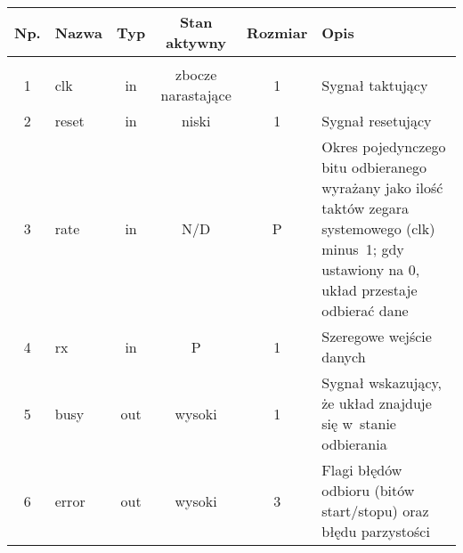 

\begin{table}[h]
\small
\centering
\begin{tabular}{|c|l|c|c|c|m{4.5cm}|}
\hline
\rowcolor[HTML]{C0C0C0}
\textbf{Np.} & \textbf{Nazwa} & \textbf{Typ} & \textbf{Stan aktywny} & \textbf{Rozmiar} & \textbf{Opis}                                                                                                                                      \\ \hline
\rowcolor[HTML]{F8A102}\multicolumn{6}{|l|}{Układ odbierający UART} \\ \hline
1            & clk            & in           & zbocze narastające    & 1                & Sygnał taktujący                                                                                                                                   \\ \hline
2            & reset          & in           & niski                 & 1                & Sygnał resetujący                                                                                                                                  \\ \hline
3            & rate           & in           & N/D                   & P                & Okres pojedynczego bitu odbieranego wyrażany jako ilość taktów zegara systemowego (clk) minus~1; gdy ustawiony na 0, układ przestaje odbierać dane \\ \hline
4            & rx             & in           & P                     & 1                & Szeregowe wejście danych                                                                                                                           \\ \hline
5            & busy           & out          & wysoki                & 1                & Sygnał wskazujący, że układ znajduje się w~stanie odbierania                                                                                       \\ \hline
6            & error          & out          & wysoki                & 3                & Flagi błędów odbioru (bitów start/stopu) oraz błędu parzystości                                                                                    \\ \hline

\end{tabular}
\end{table}
